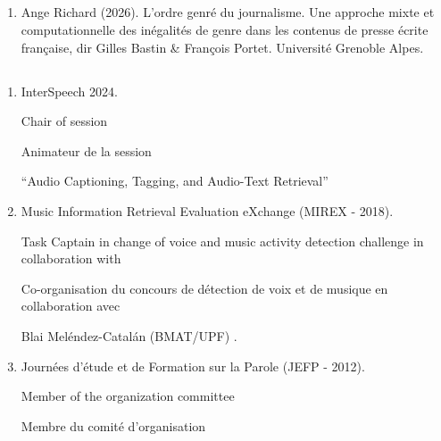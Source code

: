 \subsection{\PhdJury}

\begin{enumerate}[nosep,after=\strut, leftmargin=1em, itemsep=3pt]
\item Ange Richard (2026). L'ordre genré du journalisme. Une approche mixte et computationnelle des inégalités de genre dans les contenus de presse écrite française, dir Gilles Bastin \& François Portet. Université Grenoble Alpes. \Examinateur
\end{enumerate}


\subsection{\EvalAnim}
\begin{enumerate}[nosep,after=\strut, leftmargin=1em, itemsep=3pt]
\item InterSpeech 2024. \begin{en}Chair of session\end{en}\begin{fr}Animateur de la session \end{fr} ``Audio Captioning, Tagging, and Audio-Text Retrieval''
\item Music Information Retrieval Evaluation eXchange (MIREX - 2018).
\begin{en}Task Captain in change of voice and music activity detection challenge in collaboration with\end{en}
\begin{fr}
Co-organisation du concours de détection de voix et de musique en collaboration avec
\end{fr}
Blai Meléndez-Catalán (BMAT/UPF) .
\item Journées d’étude et de Formation sur la Parole (JEFP - 2012).
\begin{en}Member of the organization committee \end{en}
\begin{fr}Membre du comité d'organisation \end{fr}
\end{enumerate}







